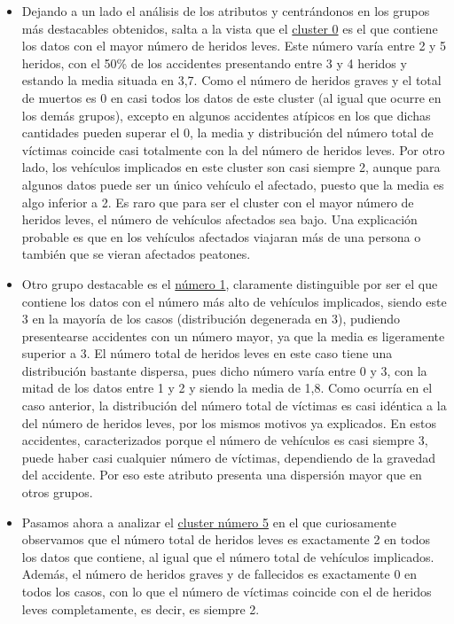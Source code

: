 \documentclass[a4paper,11pt]{book}
\begin{document}
\begin{itemize}
	\item Dejando a un lado el análisis de los atributos y centrándonos en los grupos más destacables obtenidos, salta a la vista que el \underline{cluster 0} es el que contiene los datos con el mayor número de heridos leves. Este número varía entre 2 y 5 heridos, con el 50\% de los accidentes presentando entre 3 y 4 heridos y estando la media situada en 3,7. Como el número de heridos graves y el total de muertos es 0 en casi todos los datos de este cluster (al igual que ocurre en los demás grupos), excepto en algunos accidentes atípicos en los que dichas cantidades pueden superar el 0, la media y distribución del número total de víctimas coincide casi totalmente con la del número de heridos leves. Por otro lado, los vehículos implicados en este cluster son casi siempre 2, aunque para algunos datos puede ser un único vehículo el afectado, puesto que la media es algo inferior a 2. Es raro que para ser el cluster con el mayor número de heridos leves, el número de vehículos afectados sea bajo. Una explicación probable es que en los vehículos afectados viajaran más de una persona o también que se vieran afectados peatones. 
	
	\item Otro grupo destacable es el \underline{número 1}, claramente distinguible por ser el que contiene los datos con el número más alto de vehículos implicados, siendo este 3 en la mayoría de los casos (distribución degenerada en 3), pudiendo presentearse accidentes con un número mayor, ya que la media es ligeramente superior a 3. El número total de heridos leves en este caso tiene una distribución bastante dispersa, pues dicho número varía entre 0 y 3, con la mitad de los datos entre 1 y 2 y siendo la media de 1,8. Como ocurría en el caso anterior, la distribución del número total de víctimas es casi idéntica a la del número de heridos leves, por los mismos motivos ya explicados. En estos accidentes, caracterizados porque el número de vehículos es casi siempre 3, puede haber casi cualquier número de víctimas, dependiendo de la gravedad del accidente. Por eso este atributo presenta una dispersión mayor que en otros grupos. 
	
	\item Pasamos ahora a analizar el \underline{cluster número 5} en el que curiosamente observamos que el número total de heridos leves es exactamente 2 en todos los datos que contiene, al igual que el número total de vehículos implicados. Además, el número de heridos graves y de fallecidos es exactamente 0 en todos los casos, con lo que el número de víctimas coincide con el de heridos leves completamente, es decir, es siempre 2.
	

\end{itemize}
\end{document}
